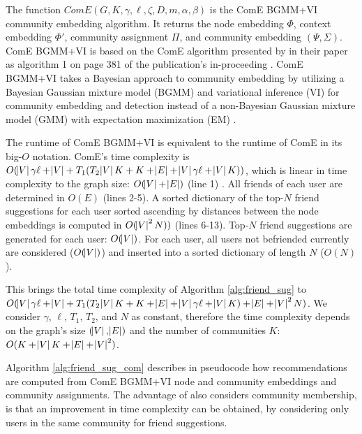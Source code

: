 \documentclass[conference]{IEEEtran}
\begin{document}
The function $ComE(G, K, \gamma, \ell, \zeta, D, m, \alpha, \beta)$ is the ComE BGMM+VI community embedding algorithm. It returns the node embedding $\Phi$, context embedding $\Phi'$, community assignment $\Pi$, and community embedding $(\Psi,\Sigma)$. ComE BGMM+VI is based on the ComE algorithm presented by \citeauthor{ComE} in their paper \citet{ComE} as algorithm 1 on page 381 of the publication's in-proceeding \cite{ComE}. ComE BGMM+VI takes a Bayesian approach to community embedding by utilizing  a Bayesian Gaussian mixture model (BGMM) and variational inference (VI) for community embedding and detection instead of a non-Bayesian Gaussian mixture model (GMM) with expectation maximization (EM) \cite{ComE_BGMM_GH}. %

The runtime of ComE BGMM+VI is equivalent to the runtime of ComE in its big-$O$ notation. ComE's time complexity is $O(\abs{V}\gamma\ell + \abs{V} + T_1 (T_2\abs{V}K + K + \abs{E} + \abs{V}\gamma\ell + \abs{V}K))$, which is linear in time complexity to the graph size: $O(\abs{V} + \abs{E})$ (line 1) \cite{ComE}. All friends of each user are determined in $O(E)$ (lines 2-5). A sorted dictionary of the top-$N$ friend suggestions for each user sorted ascending by distances between the node embeddings is computed in $O(\abs{V}^2N))$ (lines 6-13). Top-$N$ friend suggestions are generated for each user: $O(\abs{V})$. For each user, all users not befriended currently are considered ($O(\abs{V})$) and inserted into a sorted dictionary of length $N$ ($O(N)$).

This brings the total time complexity of Algorithm \ref{alg:friend_sug} to $O(\abs{V}\gamma\ell + \abs{V} + T_1 (T_2\abs{V}K + K + \abs{E} + \abs{V}\gamma\ell + \abs{V}K) + \abs{E} + \abs{V}^2N)$. We consider $\gamma$, $\ell$, $T_1$, $T_2$, and $N$ as constant, therefore the time complexity depends on the graph's size $(\abs{V}, \abs{E})$ and the number of communities $K$: $O(K + \abs{V}K + \abs{E} + \abs{V}^2)$.

Algorithm \ref{alg:friend_sug_com} describes in pseudocode how recommendations are computed from ComE BGMM+VI node and community embeddings and community assignments. The advantage of also considers community membership, is that an improvement in time complexity can be obtained, by considering only users in the same community for friend suggestions.
\end{document}
